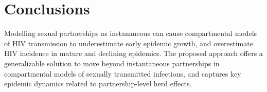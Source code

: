 \section{Conclusions}
Modelling sexual partnerships as instananeous can cause
compartmental models of HIV transmission to
underestimate early epidemic growth, and
overestimate HIV incidence in mature and declining epidemics.
The proposed approach offers a generalizable solution to move beyond instantaneous partnerships
in compartmental models of sexually transmitted infections,
and captures key epidemic dynamics related to partnership-level herd effects.
